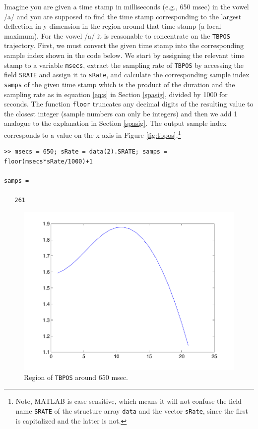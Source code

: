 \documentclass[a4paper, 12pt]{article}
\begin{document}
Imagine you are given a time stamp in milliseconds (e.g., 650 msec) in the vowel /a/ and you are supposed to find the time stamp corresponding to the largest deflection in y-dimension in the region around that time stamp (a local maximum). For the vowel /a/ it is reasonable to concentrate on the \texttt{TBPOS} trajectory. First, we must convert the given time stamp into the corresponding sample index shown in the code below. We start by assigning the relevant time stamp to a variable \texttt{msecs}, extract the sampling rate of \texttt{TBPOS} by accessing the field \texttt{SRATE} and assign it to \texttt{sRate}, and calculate the corresponding sample index \texttt{samps} of the given time stamp which is the product of the duration and the sampling rate as in equation \eqref{eq:s} in Section \ref{spasig}, divided by 1000 for seconds. The function \texttt{floor} truncates any decimal digits of the resulting value to the closest integer (sample numbers can only be integers) and then we add 1 analogue to the explanation in Section \ref{spasig}. The output sample index corresponds to a value on the x-axis in Figure \ref{fig:tbpos}.\footnote{Note, MATLAB is case sensitive, which means it will not confuse the field name \texttt{SRATE} of the structure array \texttt{data} and the vector \texttt{sRate}, since the first is capitalized and the latter is not.}



\begin{verbatim}
>> msecs = 650; sRate = data(2).SRATE; samps = floor(msecs*sRate/1000)+1

samps =

   261
\end{verbatim}


\setlength\intextsep{-10pt}
\begin{figure}
\includegraphics[scale=0.45]{localmax.pdf}%
\caption{Region of \texttt{TBPOS} around 650 msec.}\label{fig:locmax}
\end{figure}
\end{document}
